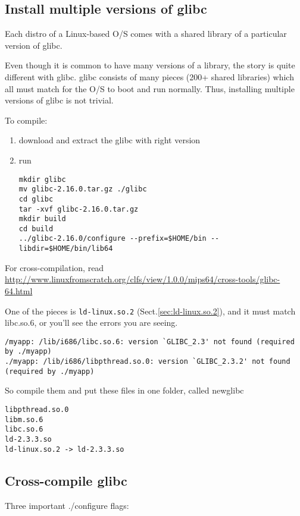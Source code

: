 \subsection{Install multiple versions of glibc}
\label{sec:glibc-install}

Each distro of a Linux-based O/S comes with a shared library of a particular
version of glibc. 

Even though it is common to have many versions of a library, the story is quite
different with glibc. glibc consists of many pieces (200+ shared libraries)
which all must match for the O/S to boot and run normally.
Thus, installing multiple versions of glibc is not trivial.

To compile:
\begin{enumerate}
  \item download and extract the glibc with right version
  
  \item run
\begin{verbatim}
mkdir glibc
mv glibc-2.16.0.tar.gz ./glibc
cd glibc
tar -xvf glibc-2.16.0.tar.gz
mkdir build
cd build
../glibc-2.16.0/configure --prefix=$HOME/bin --libdir=$HOME/bin/lib64
\end{verbatim}
\end{enumerate}
For cross-compilation, read
\url{http://www.linuxfromscratch.org/clfs/view/1.0.0/mips64/cross-tools/glibc-64.html}


One of the pieces is \verb!ld-linux.so.2! (Sect.\ref{sec:ld-linux.so.2}), and it
must match libc.so.6, or you'll see the errors you are seeing.
\begin{verbatim}
/myapp: /lib/i686/libc.so.6: version `GLIBC_2.3' not found (required by ./myapp)
./myapp: /lib/i686/libpthread.so.0: version `GLIBC_2.3.2' not found (required by ./myapp)

\end{verbatim}

So compile them and put these files in one folder, called newglibc
\begin{verbatim}
libpthread.so.0
libm.so.6
libc.so.6
ld-2.3.3.so
ld-linux.so.2 -> ld-2.3.3.so
\end{verbatim}


\subsection{Cross-compile glibc}

Three important ./configure flags:

